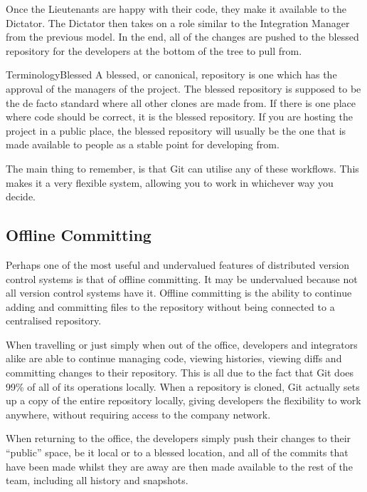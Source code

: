 Once the Lieutenants are happy with their code, they make it available to the Dictator.
The Dictator then takes on a role similar to the Integration Manager from the previous model.
In the end, all of the changes are pushed to the blessed repository for the developers at the bottom of the tree to pull from.


\begin{callout}{Terminology}{Blessed}
A blessed, or canonical, repository is one which has the approval of the managers of the project.
The blessed repository is supposed to be the de facto standard where all other clones are made from.
If there is one place where code should be correct, it is the blessed repository.
If you are hosting the project in a public place, the blessed repository will usually be the one that is made available to people as a stable point for developing from.
\end{callout}

The main thing to remember, is that Git can utilise any of these workflows.
This makes it a very flexible system, allowing you to work in whichever way you decide.

\subsection{Offline Committing}
Perhaps one of the most useful and undervalued features of distributed version control systems is that of offline committing.
It may be undervalued because not all version control systems have it.
Offline committing is the ability to continue adding and committing files to the repository without being connected to a centralised repository.

When travelling or just simply when out of the office, developers and integrators alike are able to continue managing code, viewing histories, viewing diffs and committing changes to their repository.
This is all due to the fact that Git does 99\% of all of its operations locally.
When a repository is cloned, Git actually sets up a copy of the entire repository locally, giving developers the flexibility to work anywhere, without requiring access to the company network.

When returning to the office, the developers simply push their changes to their ``public'' space, be it local or to a blessed location, and all of the commits that have been made whilst they are away are then made available to the rest of the team, including all history and snapshots.

